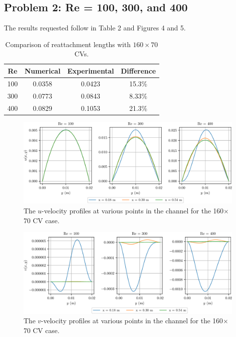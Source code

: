 \documentclass{article}
\begin{document}
\subsection{Problem 2: Re = 100, 300, and 400}

The results requested follow in Table 2 and Figures 4 and 5.

\def\arraystretch{1.3}
\begin{table}[H]
	\small
	\centering
	\caption{Comparison of reattachment lengths with $160 \times 70$ CVs.}
	\vspace{0.2cm}
	\begin{tabular}{c|c|c|c}
		Re & Numerical & Experimental & Difference \\
		\hline
		100 & 0.0358 & 0.0423 & 15.3\% \\
		300 & 0.0773 & 0.0843 & 8.33\% \\
		400 & 0.0829 & 0.1053 & 21.3\% \\
	\end{tabular}
	\label{table:b-temps}
\end{table}

\begin{figure}[H]
	\centering
	\includegraphics[width=0.9\linewidth]{../results/2_u}
	\caption{The $u$-velocity profiles at various points in the channel for the 160$\times$70 CV case.}
	\label{fig:2_u}
\end{figure}

\begin{figure}[H]
	\centering
	\includegraphics[width=0.9\linewidth]{../results/2_v}
	\caption{The $v$-velocity profiles at various points in the channel for the 160$\times$70 CV case.}
	\label{fig:2_v}
\end{figure}
\end{document}

